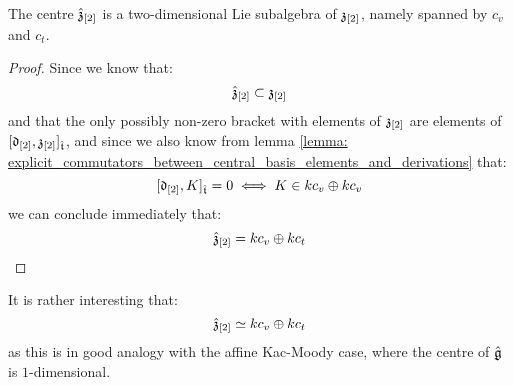         \begin{proposition} \label{prop: centres_of_extended_toroidal_lie_algebras}
            The centre $\hat{\mathfrak{z}}_{[2]}$ is a two-dimensional Lie subalgebra of $\mathfrak{z}_{[2]}$, namely spanned by $c_v$ and $c_t$. 
        \end{proposition}
            \begin{proof}
                Since we know that:
                    $$\hat{\mathfrak{z}}_{[2]} \subset \mathfrak{z}_{[2]}$$
                and that the only possibly non-zero bracket with elements of $\mathfrak{z}_{[2]}$ are elements of $[\mathfrak{d}_{[2]}, \mathfrak{z}_{[2]}]_{\hat{\mathfrak{t}}}$, and since we also know from lemma \ref{lemma: explicit_commutators_between_central_basis_elements_and_derivations} that:
                    $$[\mathfrak{d}_{[2]}, K]_{\hat{\mathfrak{t}}} = 0 \iff K \in k c_v \oplus k c_v$$
                we can conclude immediately that:
                    $$\hat{\mathfrak{z}}_{[2]} = k c_v \oplus k c_t$$
            \end{proof}
        \begin{remark}
            It is rather interesting that:
                $$\hat{\mathfrak{z}}_{[2]} \simeq k c_v \oplus k c_t$$
            as this is in good analogy with the affine Kac-Moody case, where the centre of $\hat{\mathfrak{g}}$ is $1$-dimensional.
        \end{remark}